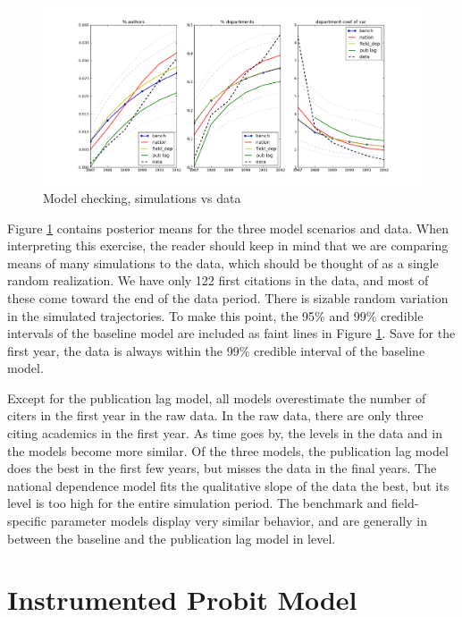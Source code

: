 \begin{figure}[!ht]
    \centering
    \includegraphics[scale=0.35]{pics/sim_plots_mc.png}
    \caption{Model checking, simulations vs data}
    \label{fig:modcheck}
\end{figure}

Figure \ref{fig:modcheck} contains posterior means for the three model
scenarios and data.  When interpreting this exercise, the reader should keep
in mind that we are comparing means of many simulations to the data, which should
be thought of as a single random realization.  We have only 122 first citations in 
the data, and most of these come toward the end of the data period. There is sizable 
random variation in the simulated trajectories.  To make this point, the
95\% and 99\% credible intervals of the baseline model are included
as faint lines in Figure \ref{fig:modcheck}.  Save for the first year, the data
is always within the 99\% credible interval of the baseline model.

Except for the publication lag model, all models overestimate the number
of citers in the first year in the raw data. In the raw data, there are
only three citing academics in the first year.  As time goes by, the levels
in the data and in the models become more similar.  Of the three models,
the publication lag model does the best in the first few years, but misses
the data in the final years.  The national dependence model fits the qualitative
slope of the data the best, but its level is too high for the entire
simulation period.  The benchmark and field-specific
parameter models display very similar behavior, and are generally in between
the baseline and the publication lag model in level.

\section{Instrumented Probit Model}
\label{sec:end_probit}

